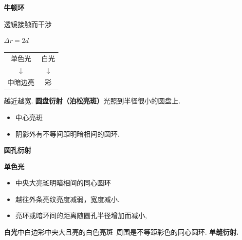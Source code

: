 \textbf{牛顿环}

透镜接触而干涉


$\Delta r=2d$ %

\begin{tabular}{@{}c@{\qquad}c@{}}
单色光 & 白光 \\
$\downarrow$ & $\downarrow$ \\
中暗边亮 & 彩 \\
\end{tabular}
\quad 越近越宽. %
\textbf{圆盘衍射（泊松亮斑）}\quad 光照到半径很小的圆盘上.


\begin{itemize}
\item 中心亮斑
\item 阴影外有不等间距明暗相间的圆环. %
\end{itemize}
\textbf{圆孔衍射}


\textbf{单色光}
\begin{itemize}
\item 中央大亮斑\quad 明暗相间的同心圆环
\item 越往外\quad 条亮纹亮度减弱，宽度减小. %
\item 亮环或暗环间的距离随圆孔半径增加而减小,
\end{itemize}

\textbf{白光}\quad 中白边彩\quad 中央大且亮的白色亮斑\ 周围是不等距彩色的同心圆环.
\textbf{单缝衍射.}

